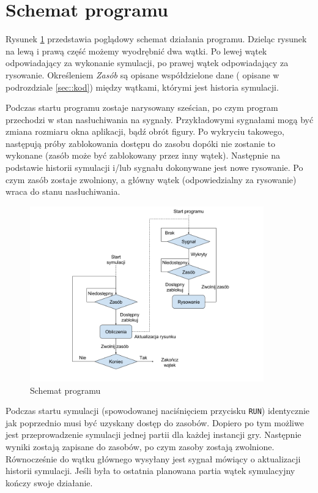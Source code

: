 
\section{Schemat programu}
\label{sec::schemat}
Rysunek \ref{fig:schemat} przedstawia poglądowy schemat działania programu. Dzieląc rysunek na lewą i prawą część możemy wyodrębnić dwa wątki. Po lewej wątek odpowiadający za wykonanie symulacji, po prawej wątek odpowiadający za rysowanie. Określeniem \textit{Zasób} są opisane współdzielone dane ( opisane w podrozdziale \ref{sec::kod}) między wątkami, którymi jest historia symulacji. 

Podczas startu programu zostaje narysowany sześcian, po czym program przechodzi w stan nasłuchiwania na sygnały. Przykładowymi sygnałami mogą być zmiana rozmiaru okna aplikacji, bądź obrót figury. Po wykryciu takowego, następują próby zablokowania dostępu do zasobu dopóki nie zostanie to wykonane (zasób może być zablokowany przez inny wątek). Następnie na podstawie historii symulacji i/lub sygnału dokonywane jest nowe rysowanie. Po czym zasób zostaje zwolniony, a główny wątek (odpowiedzialny za rysowanie) wraca do stanu nasłuchiwania. 
\begin{figure}
    \centering
    \includegraphics[width=0.9\textwidth]{pict/schemat.png}   
    \caption{Schemat programu}
	\label{fig:schemat} 
\end{figure}
Podczas startu symulacji (spowodowanej naciśnięciem przycisku \texttt{RUN}) identycznie jak poprzednio musi być uzyskany dostęp do zasobów. Dopiero po tym możliwe jest przeprowadzenie symulacji jednej partii dla każdej instancji gry. Następnie wyniki zostają zapisane do zasobów, po czym zasoby zostają zwolnione. Równocześnie do wątku głównego wysyłany jest sygnał mówiący o aktualizacji historii symulacji. Jeśli była to ostatnia planowana partia wątek symulacyjny kończy swoje działanie.

